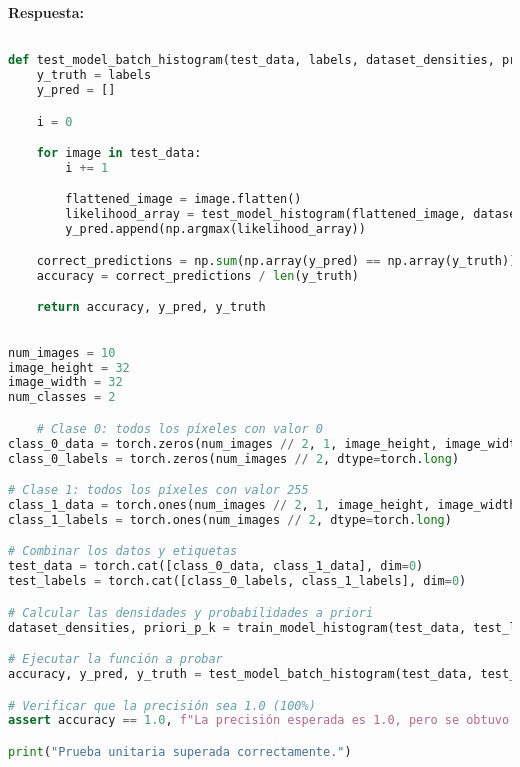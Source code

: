 \documentclass[spanish]{article}
\begin{document}
\vspace{15px}
\par \textbf{Respuesta:}

\begin{lstlisting}[language=Python, caption=Implementation Test Model Batch]

def test_model_batch_histogram(test_data, labels, dataset_densities, priori_p_k):
    y_truth = labels
    y_pred = []

    i = 0

    for image in test_data:
        i += 1

        flattened_image = image.flatten()
        likelihood_array = test_model_histogram(flattened_image, dataset_densities, priori_p_k)
        y_pred.append(np.argmax(likelihood_array))

    correct_predictions = np.sum(np.array(y_pred) == np.array(y_truth))
    accuracy = correct_predictions / len(y_truth)

    return accuracy, y_pred, y_truth

\end{lstlisting}

\begin{lstlisting}[language=Python, caption=Prueba Test Model Batch]

num_images = 10
image_height = 32
image_width = 32
num_classes = 2

    # Clase 0: todos los píxeles con valor 0
class_0_data = torch.zeros(num_images // 2, 1, image_height, image_width)
class_0_labels = torch.zeros(num_images // 2, dtype=torch.long)

# Clase 1: todos los píxeles con valor 255
class_1_data = torch.ones(num_images // 2, 1, image_height, image_width) * 255
class_1_labels = torch.ones(num_images // 2, dtype=torch.long)

# Combinar los datos y etiquetas
test_data = torch.cat([class_0_data, class_1_data], dim=0)
test_labels = torch.cat([class_0_labels, class_1_labels], dim=0)

# Calcular las densidades y probabilidades a priori
dataset_densities, priori_p_k = train_model_histogram(test_data, test_labels)

# Ejecutar la función a probar
accuracy, y_pred, y_truth = test_model_batch_histogram(test_data, test_labels, dataset_densities, priori_p_k)

# Verificar que la precisión sea 1.0 (100%)
assert accuracy == 1.0, f"La precisión esperada es 1.0, pero se obtuvo {accuracy}"

print("Prueba unitaria superada correctamente.")

\end{lstlisting}
\end{document}
